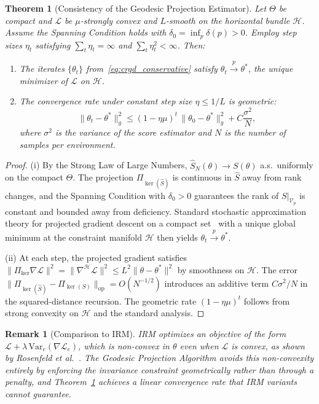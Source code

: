 \documentclass[11pt,a4paper]{article}
\newtheorem{theorem}{Theorem}[section]
\newtheorem{remark}{Remark}
\newcommand{\cH}{\mathcal{H}}
\newcommand{\cV}{\mathcal{V}}
\begin{document}
\begin{theorem}[Consistency of the Geodesic Projection Estimator]\label{thm:convergence}
Let $\Theta$ be compact and $\mathcal{L}$ be $\mu$-strongly convex and $L$-smooth on the horizontal bundle $\cH$. Assume the Spanning Condition holds with $\delta_0 = \inf_p \delta(p) > 0$. Employ step sizes $\eta_t$ satisfying $\sum_t \eta_t = \infty$ and $\sum_t \eta_t^2 < \infty$. Then:
\begin{enumerate}[label=(\roman*)]
\item The iterates $\{\theta_t\}$ from~\eqref{eq:crgd_conservative} satisfy $\theta_t \xrightarrow{p} \theta^*$, the unique minimizer of $\mathcal{L}$ on $\cH$.
\item The convergence rate under constant step size $\eta \leq 1/L$ is geometric:
\[
\|\theta_t - \theta^*\|^2_g \leq (1 - \eta\mu)^t\, \|\theta_0 - \theta^*\|^2_g + C \frac{\sigma^2}{N},
\]
where $\sigma^2$ is the variance of the score estimator and $N$ is the number of samples per environment.
\end{enumerate}
\end{theorem}

\begin{proof}
(i) By the Strong Law of Large Numbers, $\hat S_N(\theta) \to S(\theta)$ a.s.\ uniformly on the compact $\Theta$. The projection $\Pi_{\ker(\hat S)}$ is continuous in $\hat S$ away from rank changes, and the Spanning Condition with $\delta_0 > 0$ guarantees the rank of $S|_{\cV_p}$ is constant and bounded away from deficiency. Standard stochastic approximation theory for projected gradient descent on a compact set~\cite{kushner2003} with a unique global minimum at the constraint manifold $\cH$ then yields $\theta_t \xrightarrow{p} \theta^*$.

(ii) At each step, the projected gradient satisfies $\|\Pi_{\ker} \nabla \mathcal{L}\|^2 = \|\nabla^\cH \mathcal{L}\|^2 \leq L^2 \|\theta - \theta^*\|^2$ by smoothness on $\cH$. The error $\|\Pi_{\ker(\hat S)} - \Pi_{\ker(S)}\|_{\mathrm{op}} = O(N^{-1/2})$ introduces an additive term $C\sigma^2/N$ in the squared-distance recursion. The geometric rate $(1 - \eta\mu)^t$ follows from strong convexity on $\cH$ and the standard analysis.
\end{proof}

\begin{remark}[Comparison to IRM]
IRM optimizes an objective of the form $\mathcal{L} + \lambda\,\mathrm{Var}_e(\nabla\mathcal{L}_e)$, which is non-convex in $\theta$ even when $\mathcal{L}$ is convex, as shown by Rosenfeld et al.~\cite{rosenfeld2020}. The Geodesic Projection Algorithm avoids this non-convexity entirely by enforcing the invariance constraint geometrically rather than through a penalty, and Theorem~\ref{thm:convergence} achieves a linear convergence rate that IRM variants cannot guarantee.
\end{remark}
\end{document}

